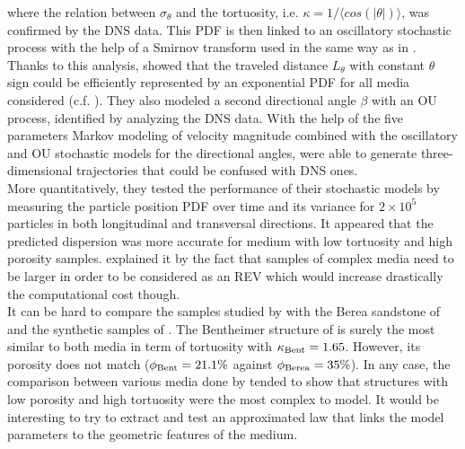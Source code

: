 where the relation between $\sigma_\theta$ and the tortuosity, i.e. $\kappa=1/\langle cos(|\theta|)\rangle$, was confirmed by the DNS data. This PDF is then linked to an oscillatory stochastic process with the help of a Smirnov transform used in the same way as in \citet{Puyguiraud2019}. \\
Thanks to this analysis, \citeauthor{Meyer2016} showed that the traveled distance $L_\theta$ with constant $\theta$ sign could be efficiently represented by an exponential PDF for all media considered (c.f. \citet[Fig- 12]{Meyer2016}). They also modeled a second directional angle $\beta$ with an OU process, identified by analyzing the DNS data.
With the help of the five parameters Markov modeling of velocity magnitude combined with the oscillatory and OU stochastic models for the directional angles, \citet{Meyer2016} were able to generate three-dimensional trajectories that could be confused with DNS ones. \\
More quantitatively, they tested the performance of their stochastic models by measuring the particle position PDF over time and its variance for $2\times 10^5$ particles in both longitudinal and transversal directions.
It appeared that the predicted dispersion was more accurate for medium with low tortuosity and high porosity samples. 
\cite{Meyer2016} explained it by the fact that samples of complex media need to be larger in order to be considered as an REV which would increase drastically the computational cost though.\\

It can be hard to compare the samples studied by \citeauthor{Meyer2016} with the Berea sandstone of \citet{Dentz2017} and the synthetic samples of \citet{Puyguiraud2019}. 
The Bentheimer structure of \citet{Meyer2016} is surely the most similar to both media in term of tortuosity with $\kappa_{\rm{Bent}}=1.65$. 
However, its porosity does not match ($\phi_{\rm{Bent}}=21.1\%$ against $\phi_{\rm{Berea}}=35\%$).
In any case, the comparison between various media done by \citet{Meyer2016} tended to show that structures with low porosity and high tortuosity were the most complex to model. 
It would be interesting to try to extract and test an approximated law that links the model parameters to the geometric features of the medium.\\

